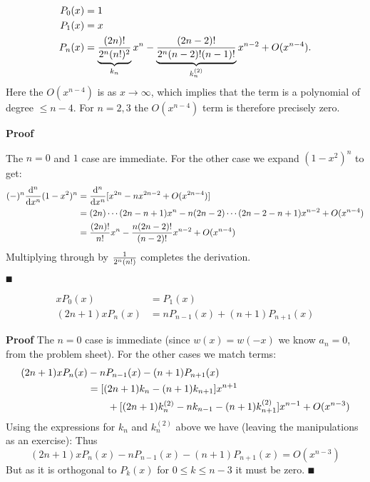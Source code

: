 \begin{lemma}
\begin{align*}
P_0(x) &= 1 \\
P_1(x) &= x \\
P_n(x) &= \underbrace{{(2n)! \over 2^n (n!)^2}}_{k_n} x^n - \underbrace{(2n-2)! \over 2^n (n-2)! (n-1)!}_{k_n^{(2)}} x^{n-2} + O(x^{n-4}).
\end{align*}
Here the $O(x^{n-4})$ is as $x \ensuremath{\rightarrow} \ensuremath{\infty}$, which implies that the term is a polynomial of degree $\ensuremath{\leq} n-4$. For $n = 2,3$ the $O(x^{n-4})$ term is therefore precisely zero.

\end{lemma}
\textbf{Proof}

The $n=0$ and $1$ case are immediate. For the other case we expand $(1-x^2)^n$ to get:
\begin{align*}
(-)^n {{\rm d}^n \over {\rm d} x^n} (1-x^2)^n &=
{{\rm d}^n \over {\rm d} x^n} [ x^{2n} - n x^{2n-2} + O(x^{2n-4})]\\
&= (2n)\ensuremath{\cdots}(2n-n+1) x^n - n (2n-2)\ensuremath{\cdots}(2n-2-n+1) x^{n-2} + O(x^{n-4}) \\
&= {(2n)! \over n!} x^n - {n (2n-2)! \over (n-2)!} x^{n-2} + O(x^{n-4})
\end{align*}
Multiplying through by ${1 \over 2^n (n!)}$ completes the derivation.

\ensuremath{\QED}

\begin{theorem}
\begin{align*}
xP_0(x) &= P_1(x) \\
(2n+1) xP_n(x) &= nP_{n-1}(x) + (n+1)P_{n+1}(x)
\end{align*}
\end{theorem}
\textbf{Proof} The $n = 0$ case is immediate (since $w(x) = w(-x)$ we know $a_n = 0$, from the problem sheet). For the other cases we match terms:
\begin{align*}
(2n+1)xP_n(x) &- n P_{n-1}(x) - (n+1)P_{n+1}(x) \ccr
 = [(2n+1)k_n - (n+1) k_{n+1}] x^{n+1} \cr
 &\qquad  + [(2n+1) k_n^{(2)} -n k_{n-1} - (n+1) k_{n+1}^{(2)}] x^{n-1} + O(x^{n-3})
\end{align*}
Using the expressions for $k_n$ and $k_n^{(2)}$ above we have (leaving the manipulations as an exercise):
Thus
\[
(2n+1)xP_n(x) - n P_{n-1}(x) - (n+1)P_{n+1}(x) = O(x^{n-3})
\]
But as it is orthogonal to $P_k(x)$ for $0 \ensuremath{\leq} k \ensuremath{\leq} n-3$ it must be zero. \ensuremath{\QED}



